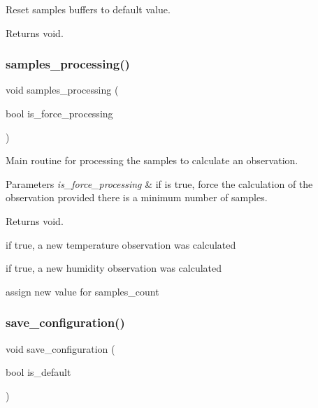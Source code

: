 Reset samples buffers to default value. 

\begin{DoxyReturn}{Returns}
void. 
\end{DoxyReturn}
\mbox{\label{i2c-th_8h_aba0fc91d6c2829df00a9d5fe2b921c90}} 
\subsubsection{\texorpdfstring{samples\+\_\+processing()}{samples\_processing()}}
{\footnotesize\ttfamily void samples\+\_\+processing (\begin{DoxyParamCaption}\item[{bool}]{is\+\_\+force\+\_\+processing }\end{DoxyParamCaption})}



Main routine for processing the samples to calculate an observation. 


\begin{DoxyParams}{Parameters}
{\em is\+\_\+force\+\_\+processing} & if is true, force the calculation of the observation provided there is a minimum number of samples. \\
\hline
\end{DoxyParams}
\begin{DoxyReturn}{Returns}
void. 
\end{DoxyReturn}
if true, a new temperature observation was calculated

if true, a new humidity observation was calculated

assign new value for samples\+\_\+count \mbox{\label{i2c-th_8h_a8801fa7c9f323c5b8b9b2bb5b1c438ff}} 
\subsubsection{\texorpdfstring{save\+\_\+configuration()}{save\_configuration()}}
{\footnotesize\ttfamily void save\+\_\+configuration (\begin{DoxyParamCaption}\item[{bool}]{is\+\_\+default }\end{DoxyParamCaption})}



